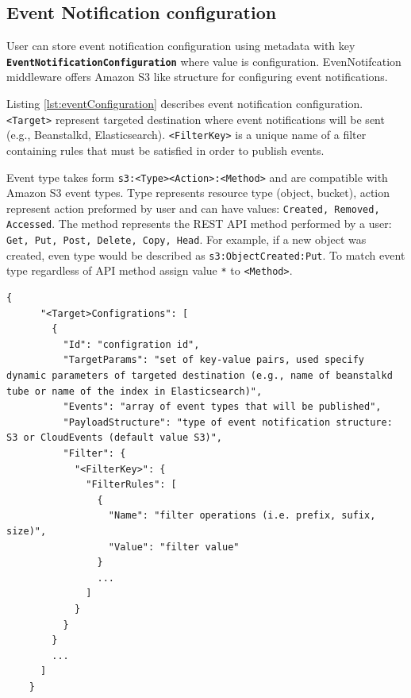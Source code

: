     \subsection{Event Notification configuration}
    User can store event notification configuration using metadata with key \textbf{\texttt{\newline EventNotificationConfiguration}} where value is configuration.
    EvenNotifcation middleware offers Amazon S3 like structure for configuring event notifications.

    Listing \ref{lst:eventConfiguration} describes event notification configuration. \texttt{<Target>} represent targeted destination where event notifications will be sent (e.g., Beanstalkd, Elasticsearch). \texttt{<FilterKey>} is a unique name of a filter containing rules that must be satisfied in order to publish events.

    Event type takes form \texttt{s3:<Type><Action>:<Method>} and are compatible with Amazon S3 event types. Type represents resource type (object, bucket), action represent action preformed by user and can have values: \texttt{Created, Removed, Accessed}. The method represents the REST API method performed by a user: \texttt{Get, Put, Post, Delete, Copy, Head}. For example, if a new object was created, even type would be described as \texttt{\newline s3:ObjectCreated:Put}. To match event type regardless of API method assign value \texttt{*} to \texttt{<Method>}.

    \begin{minipage}{\linewidth}
    \begin{lstlisting}[style=jsonStyle, caption=Strucute of event notification configuration,    label=lst:eventConfiguration]
    {
      "<Target>Configrations": [
        {
          "Id": "configration id",
          "TargetParams": "set of key-value pairs, used specify dynamic parameters of targeted destination (e.g., name of beanstalkd tube or name of the index in Elasticsearch)",
          "Events": "array of event types that will be published",
          "PayloadStructure": "type of event notification structure: S3 or CloudEvents (default value S3)",
          "Filter": {
            "<FilterKey>": {
              "FilterRules": [
                {
                  "Name": "filter operations (i.e. prefix, sufix, size)",
                  "Value": "filter value"
                }
                ...
              ]
            }
          }
        }
        ...
      ]
    }
    \end{lstlisting}
    \end{minipage}


